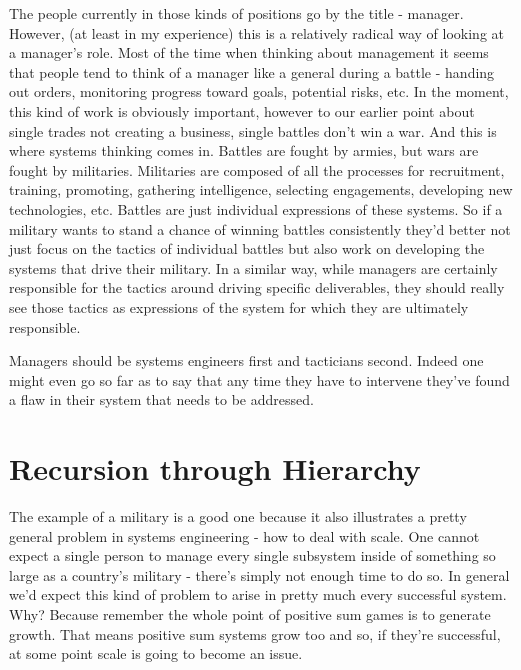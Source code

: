 \documentclass[11pt,a5paper]{book}
\begin{document}
The people currently in those kinds of positions go by the title - manager. However, (at least in my experience) this is a relatively radical way of looking at a manager's role. Most of the time when thinking about management it seems that people tend to think of a manager like a general during a battle - handing out orders, monitoring progress toward goals, potential risks, etc. In the moment, this kind of work is obviously important, however to our earlier point about single trades not creating a business, single battles don't win a war. And this is where systems thinking comes in. Battles are fought by armies, but wars are fought by militaries. Militaries are composed of all the processes for recruitment, training, promoting, gathering intelligence, selecting engagements, developing new technologies, etc. Battles are just individual expressions of these systems. So if a military wants to stand a chance of winning battles consistently they'd better not just focus on the tactics of individual battles but also work on developing the systems that drive their military. In a similar way, while managers are certainly responsible for the tactics around driving specific deliverables, they should really see those tactics as expressions of the system for which they are ultimately responsible.
\newline

Managers should be systems engineers first and tacticians second. Indeed one might even go so far as to say that any time they have to intervene they've found a flaw in their system that needs to be addressed. 

\section{Recursion through Hierarchy}
The example of a military is a good one because it also illustrates a pretty general problem in systems engineering - how to deal with scale. One cannot expect a single person to manage every single subsystem inside of something so large as a country's military - there's simply not enough time to do so. In general we'd expect this kind of problem to arise in pretty much every successful system. Why? Because remember the whole point of positive sum games is to generate growth. That means positive sum systems grow too and so, if they're successful, at some point scale is going to become an issue. 
\newline
\end{document}
